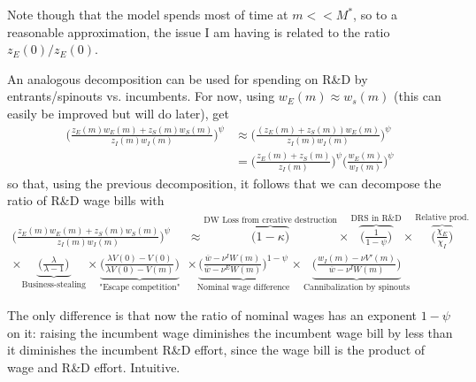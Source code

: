 \documentclass[12pt,english]{article}
\theoremstyle{remark}
\begin{document}
\begin{itemize}
 	Note though that the model spends most of time at $m << M^*$, so to a reasonable approximation, the issue I am having is related to the ratio $z_E(0) / z_E(0)$. 
 	
 	An analogous decomposition can be used for spending on R\&D by entrants/spinouts vs. incumbents. For now, using $w_E(m) \approx w_s(m)$ (this can easily be improved but will do later), get 
 	\begin{align*}
 		\Bigg(\frac{z_E(m)w_E(m) + z_S(m)w_S(m)}{z_I(m) w_I(m)}\Bigg)^{\psi} &\approx \Bigg(\frac{(z_E(m) + z_S(m)) w_E(m) }{z_I(m) w_I(m)}\Bigg)^{\psi} \\  
 		&= \Bigg(  \frac{z_E(m) + z_S(m)}{z_I(m)}\Bigg)^{\psi} \Bigg( \frac{w_E(m)}{w_I(m)}\Bigg)^{\psi}
 	\end{align*}
 	so that, using the previous decomposition, it follows that we can decompose the ratio of R\&D wage bills with 
 	\begin{align*}
 	 \Bigg(\frac{z_E(m)w_E(m) + z_S(m)w_S(m)}{z_I(m) w_I(m)}\Bigg)^{\psi}  &\approx \overbrace{\Bigg(1-\kappa \Bigg) }^{\textrm{DW Loss from creative destruction}}\times  \overbrace{\Bigg(\frac{1}{1-\psi} \Bigg)}^{\textrm{DRS in R\&D}} \times \overbrace{\Bigg( \frac{\chi_E}{\chi_I} \Bigg) }^{\textrm{Relative prod.}} \\ \times \underbrace{\Bigg( \frac{\lambda}{\lambda - 1}  \Bigg) }_{\textrm{Business-stealing}} \times \underbrace{\Bigg( \frac{\lambda V(0) - V(0)}{\lambda V(0) - V(m)}\Bigg)}_{\textrm{"Escape competition"}}
 	&\times \underbrace{\Bigg( \frac{\overline{w} - \nu^I W(m)}{\overline{w} - \nu^E W(m)}\Bigg)^{1-\psi}}_{\textrm{Nominal wage difference}} \times \underbrace{\Bigg( \frac{w_I(m) - \nu V'(m)}{\overline{w} - \nu^I W(m)} \Bigg)}_{\textrm{Cannibalization by spinouts}}
 	\end{align*}
 		
 	The only difference is that now the ratio of nominal wages has an exponent $1-\psi$ on it: raising the incumbent wage diminishes the incumbent wage bill by less than it diminishes the incumbent R\&D effort, since the wage bill is the product of wage and R\&D effort. Intuitive. 	
 	

\end{itemize}
\end{document}
